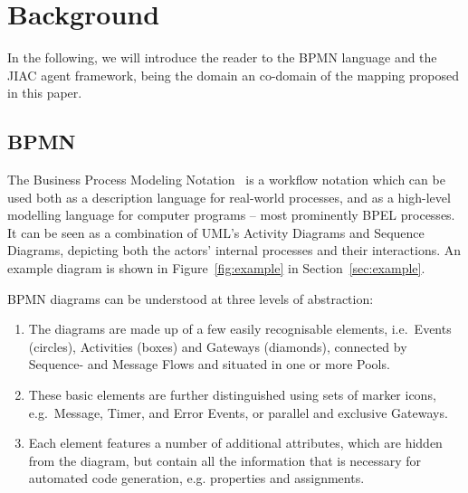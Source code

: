 

\section{Background}
\label{sec:background}

In the following, we will introduce the reader to the BPMN language and the JIAC
agent framework, being the domain an co-domain of the mapping proposed in this
paper.



\subsection{BPMN}
\label{sec:bpmn}

The Business Process Modeling Notation~\cite{omg2009bpmn} is a workflow notation
which can be used both as a description language for real-world processes, and as
a high-level modelling language for computer programs -- most prominently BPEL
processes.  It can be seen as a combination of UML's Activity Diagrams and Sequence
Diagrams, depicting both the actors' internal processes and their interactions.
An example diagram is shown in Figure~\ref{fig:example} in Section~\ref{sec:example}.

BPMN diagrams can be understood at three levels of abstraction:

\begin{enumerate}
	\item The diagrams are made up of a few easily recognisable elements, i.e.\
	Events (circles), Activities (boxes) and Gateways (diamonds), connected by
	Sequence- and Message Flows and situated in one or more Pools.
	
	\item These basic elements are further distinguished using sets of marker
	icons, e.g.\ Message, Timer, and Error Events, or parallel and exclusive
	Gateways.
	
	\item Each element features a number of additional attributes, which are
	hidden from the diagram, but contain all the information that is necessary
	for automated code generation, e.g. properties and assignments.
\end{enumerate}


